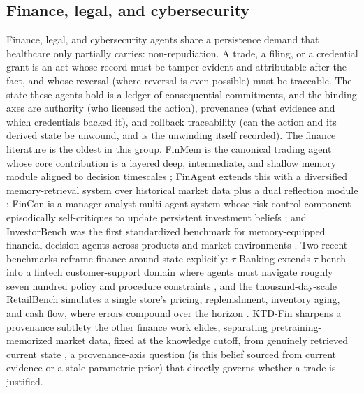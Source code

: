 \subsection{Finance, legal, and cybersecurity}

Finance, legal, and cybersecurity agents share a persistence demand that healthcare only partially carries: non-repudiation. A trade, a filing, or a credential grant is an act whose record must be tamper-evident and attributable after the fact, and whose reversal (where reversal is even possible) must be traceable. The state these agents hold is a ledger of consequential commitments, and the binding axes are authority (who licensed the action), provenance (what evidence and which credentials backed it), and rollback traceability (can the action and its derived state be unwound, and is the unwinding itself recorded). The finance literature is the oldest in this group. FinMem is the canonical trading agent whose core contribution is a layered deep, intermediate, and shallow memory module aligned to decision timescales \citep{yu2023finmem}; FinAgent extends this with a diversified memory-retrieval system over historical market data plus a dual reflection module \citep{zhang2024finagent}; FinCon is a manager-analyst multi-agent system whose risk-control component episodically self-critiques to update persistent investment beliefs \citep{yu2024fincon}; and InvestorBench was the first standardized benchmark for memory-equipped financial decision agents across products and market environments \citep{li2024investorbench}. Two recent benchmarks reframe finance around state explicitly: $\tau$-Banking extends $\tau$-bench into a fintech customer-support domain where agents must navigate roughly seven hundred policy and procedure constraints \citep{shi2026tauknowledge}, and the thousand-day-scale RetailBench simulates a single store's pricing, replenishment, inventory aging, and cash flow, where errors compound over the horizon \citep{zhang2026retailbench}. KTD-Fin sharpens a provenance subtlety the other finance work elides, separating pretraining-memorized market data, fixed at the knowledge cutoff, from genuinely retrieved current state \citep{zhu2026ktdfin}, a provenance-axis question (is this belief sourced from current evidence or a stale parametric prior) that directly governs whether a trade is justified.

